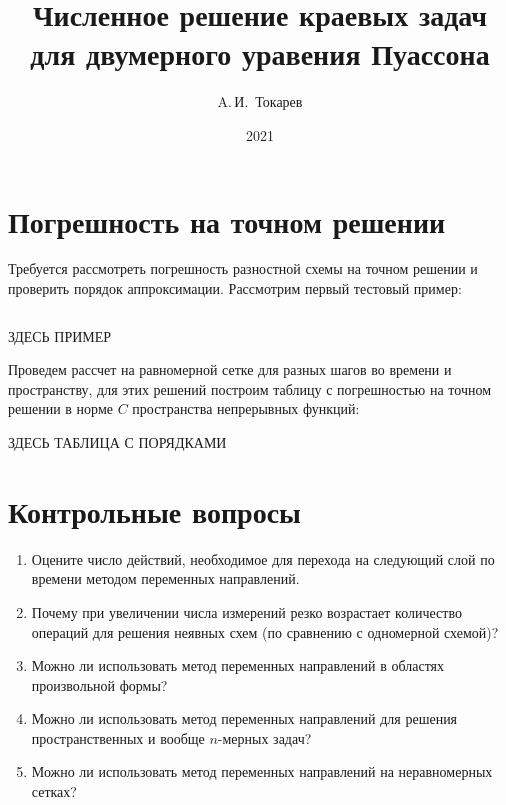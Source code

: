 \documentclass[12pt, a4paper]{article}
\title{Численное решение краевых задач для двумерного уравения Пуассона}
\author{A.\,И.~Токарев}
\date{2021}
\newcommand{\Picture}[4]
{
\begin{figure}[H]
\noindent 
\centering\texttt{[image: pic/\#1]}
\caption{#3}
\label{#4}
\end{figure}
}
\begin{document}
\maketitle
\tableofcontents 
\newpage

\section{Погрешность на точном решении}

Требуется рассмотреть погрешность разностной схемы на точном решении и проверить порядок аппроксимации. Рассмотрим первый тестовый пример:

\[
\]

\centerline{ЗДЕСЬ ПРИМЕР}

Проведем рассчет на равномерной сетке для разных шагов во времени и пространству, для этих решений построим таблицу с погрешностью на точном решении в норме $C$ пространства непрерывных функций:

\centerline{ЗДЕСЬ ТАБЛИЦА С ПОРЯДКАМИ}


\newpage
\section{Контрольные вопросы}
\begin{enumerate}
\item Оцените число действий, необходимое для перехода на следующий слой по времени методом переменных направлений.

\item Почему при увеличении числа измерений резко возрастает количество операций для решения неявных схем (по сравнению с одномерной схемой)?

\item Можно ли использовать метод переменных направлений в
областях произвольной формы?

\item Можно ли использовать метод переменных направлений для решения пространственных и вообще $n$-мерных задач?

\item Можно ли использовать метод переменных направлений на неравномерных сетках?

\end{enumerate}


\newpage
\end{document}
